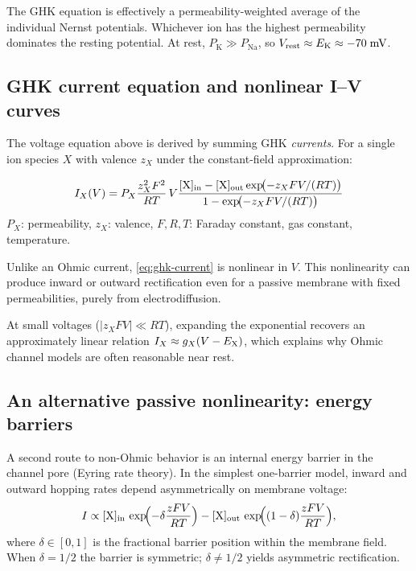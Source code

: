 The GHK equation is effectively a permeability-weighted average of the individual Nernst potentials. Whichever ion has the highest permeability dominates the resting potential. At rest, $P_{\text{K}} \gg P_{\text{Na}}$, so $V_{\text{rest}} \approx E_{\mathrm{K}} \approx -70\;\text{mV}$.

\subsection{GHK current equation and nonlinear I--V curves}

The voltage equation above is derived by summing GHK \emph{currents}. For a single ion species $X$ with valence $z_X$ under the constant-field approximation:
%
\begin{keyequation}
\begin{equation}
  I_X(V) =
  P_X \frac{z_X^2 F^2}{RT}\,V
  \frac{[\mathrm{X}]_{\text{in}} - [\mathrm{X}]_{\text{out}}\exp\!\bigl(-z_XFV/(RT)\bigr)}
       {1 - \exp\!\bigl(-z_XFV/(RT)\bigr)}
  \label{eq:ghk-current}
\end{equation}
\tcblower
$P_X$: permeability, \quad
$z_X$: valence, \quad
$F,R,T$: Faraday constant, gas constant, temperature.
\end{keyequation}
%
\noindent Unlike an Ohmic current, \cref{eq:ghk-current} is nonlinear in $V$. This nonlinearity can produce inward or outward rectification even for a passive membrane with fixed permeabilities, purely from electrodiffusion.

At small voltages ($|z_X F V| \ll RT$), expanding the exponential recovers an approximately linear relation $I_X \approx g_X(V - E_{\mathrm{X}})$, which explains why Ohmic channel models are often reasonable near rest.

\subsection{An alternative passive nonlinearity: energy barriers}

A second route to non-Ohmic behavior is an internal energy barrier in the channel pore (Eyring rate theory). In the simplest one-barrier model, inward and outward hopping rates depend asymmetrically on membrane voltage:
%
\begin{equation}
  I \propto
  [\mathrm{X}]_{\text{in}}\,\exp\!\Bigl(-\delta \frac{zFV}{RT}\Bigr)
  -
  [\mathrm{X}]_{\text{out}}\,\exp\!\Bigl((1-\delta)\frac{zFV}{RT}\Bigr),
  \label{eq:eyring}
\end{equation}
%
where $\delta \in [0,1]$ is the fractional barrier position within the membrane field. When $\delta=1/2$ the barrier is symmetric; $\delta \neq 1/2$ yields asymmetric rectification.

